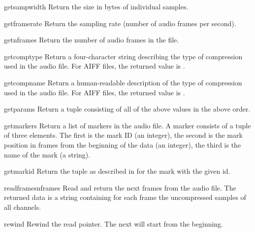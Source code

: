 \begin{funcdesc}{getsampwidth}{}
Return the size in bytes of individual samples.
\end{funcdesc}

\begin{funcdesc}{getframerate}{}
Return the sampling rate (number of audio frames per second).
\end{funcdesc}

\begin{funcdesc}{getnframes}{}
Return the number of audio frames in the file.
\end{funcdesc}

\begin{funcdesc}{getcomptype}{}
Return a four-character string describing the type of compression used
in the audio file.  For AIFF files, the returned value is
.
\end{funcdesc}

\begin{funcdesc}{getcompname}{}
Return a human-readable description of the type of compression used in
the audio file.  For AIFF files, the returned value is .
\end{funcdesc}

\begin{funcdesc}{getparams}{}
Return a tuple consisting of all of the above values in the above
order.
\end{funcdesc}

\begin{funcdesc}{getmarkers}{}
Return a list of markers in the audio file.  A marker consists of a
tuple of three elements.  The first is the mark ID (an integer), the
second is the mark position in frames from the beginning of the data
(an integer), the third is the name of the mark (a string).
\end{funcdesc}

\begin{funcdesc}{getmark}{id}
Return the tuple as described in  for the mark with
the given id.
\end{funcdesc}

\begin{funcdesc}{readframes}{nframes}
Read and return the next  frames from the audio file.  The
returned data is a string containing for each frame the uncompressed
samples of all channels.
\end{funcdesc}

\begin{funcdesc}{rewind}{}
Rewind the read pointer.  The next  will start from
the beginning.
\end{funcdesc}

